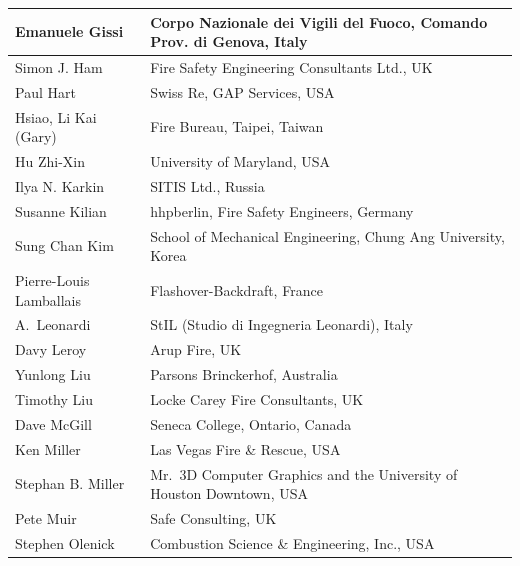 \documentclass[11pt]{book}
\begin{document}
\begin{longtable}{|l|l|}
Emanuele Gissi                          & Corpo Nazionale dei Vigili del Fuoco, Comando Prov. di Genova, Italy                  \\ \hline
Simon J. Ham                            & Fire Safety Engineering Consultants Ltd., UK                  \\ \hline
Paul Hart                               & Swiss Re, GAP Services, USA                  \\ \hline
Hsiao, Li Kai (Gary)                    & Fire Bureau, Taipei, Taiwan                  \\ \hline
Hu Zhi-Xin                              & University of Maryland, USA                                            \\ \hline
Ilya N. Karkin                          & SITIS Ltd., Russia                  \\ \hline
Susanne Kilian                          & hhpberlin, Fire Safety Engineers, Germany                  \\ \hline
Sung Chan Kim                           & School of Mechanical Engineering, Chung Ang University, Korea                  \\ \hline
Pierre-Louis Lamballais                 & Flashover-Backdraft, France                                                                  \\ \hline
A.~Leonardi                             & StIL (Studio di Ingegneria Leonardi), Italy                         \\ \hline
Davy Leroy                              & Arup Fire, UK                 \\ \hline
Yunlong Liu                             & Parsons Brinckerhof, Australia                   \\ \hline
Timothy Liu                             & Locke Carey Fire Consultants, UK                  \\ \hline
Dave McGill                             & Seneca College, Ontario, Canada                  \\ \hline
Ken Miller                              & Las Vegas Fire \& Rescue, USA                  \\ \hline
Stephan B. Miller                       & Mr.~3D Computer Graphics and the University of Houston Downtown, USA                  \\ \hline
Pete Muir                               & Safe Consulting, UK                  \\ \hline
Stephen Olenick                         & Combustion Science \& Engineering, Inc., USA                  \\ \hline

\end{longtable}
\end{document}
